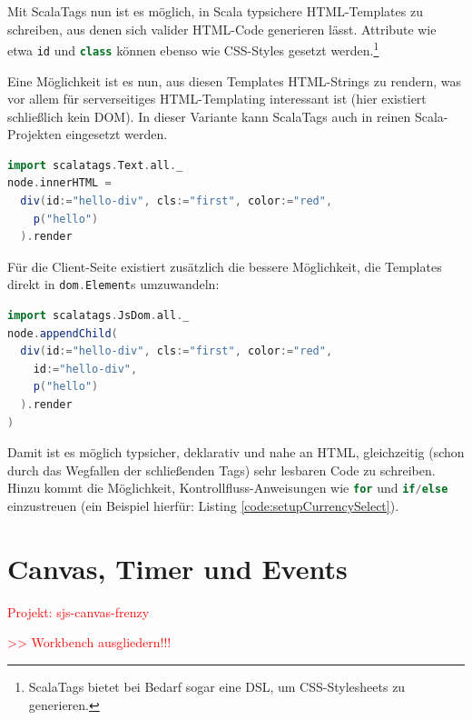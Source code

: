\documentclass[a4paper, 12pt, hidelinks, listof=totoc, listoftables=totoc, bibliography=totoc]{scrreprt}
\newcommand{\code}[1]{\lstinline[language=Scala, style=inline]|#1|}
\newcommand{\scala}[1]{\lstinline[language=Scala, style=inline]|#1|}
\newcommand{\TODO}[1]{\textcolor{red}{#1}\newline}
\begin{document}
Mit ScalaTags nun ist es möglich, in Scala typsichere HTML-Templates zu schreiben, aus denen sich valider HTML-Code generieren lässt. Attribute wie etwa \code{id} und \code{class} können ebenso wie CSS-Styles gesetzt werden.\footnote{ScalaTags bietet bei Bedarf sogar eine \ac{DSL}, um CSS-Stylesheets zu generieren.}

Eine Möglichkeit ist es nun, aus diesen Templates HTML-Strings zu rendern, was vor allem für serverseitiges HTML-Templating interessant ist (hier existiert schließlich kein \ac{DOM}). In dieser Variante kann ScalaTags auch in reinen Scala-Projekten eingesetzt werden.

\begin{lstlisting}[language=Scala, caption={HTML-Generierung mit ScalaTags und Strings.}]
import scalatags.Text.all._
node.innerHTML =
  div(id:="hello-div", cls:="first", color:="red",
    p("hello")
  ).render
\end{lstlisting}

Für die Client-Seite existiert zusätzlich die bessere Möglichkeit, die Templates direkt in \scala{dom.Element}s umzuwandeln:

\begin{lstlisting}[language=Scala, caption={HTML-Generierung mit ScalaTags und Nodes.}]
import scalatags.JsDom.all._
node.appendChild(
  div(id:="hello-div", cls:="first", color:="red",
    id:="hello-div",
    p("hello")
  ).render
)
\end{lstlisting}

Damit ist es möglich typsicher, deklarativ und nahe an HTML, gleichzeitig (schon durch das Wegfallen der schließenden Tags) sehr lesbaren Code zu schreiben. Hinzu kommt die Möglichkeit, Kontrollfluss-Anweisungen wie \scala{for} und \scala{if/else} einzustreuen (ein Beispiel hierfür: Listing \ref{code:setupCurrencySelect}).



\section{Canvas, Timer und Events}

\TODO{Projekt: sjs-canvas-frenzy}

\TODO{>> Workbench ausgliedern!!!}

\end{document}
